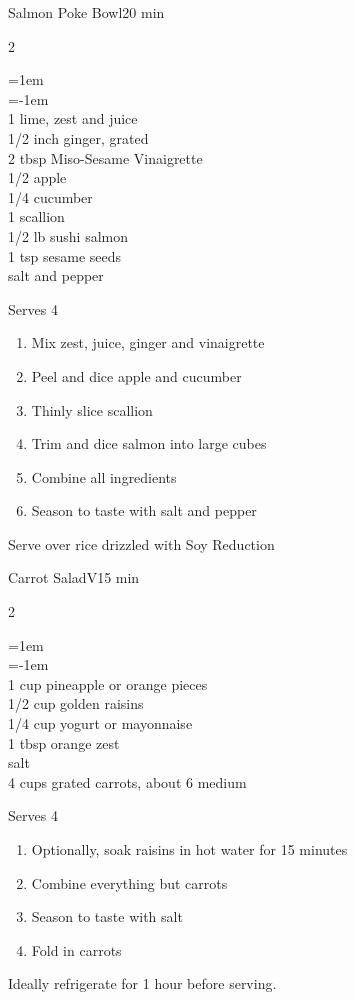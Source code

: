 \documentclass{article}
\newenvironment{recipe}[3][]
    {\begin{cardbase}[#1]{#2}{#3}
    \columnratio{0.333}
    \begin{paracol}{2}}
    {\end{paracol}\end{cardbase}}
\newcommand{\nextcolumn}{\switchcolumn}
\newenvironment{ingredients}
    {
    \begin{obeylines}
    \vspace{\parskip}
    \setlength{\parskip}{0.25em}
    \vspace{-0.25em}
    \leftskip=1em
    \parindent=-1em}
    {\end{obeylines}}
\newenvironment{steps}
    {\begin{enumerate}[leftmargin=*,topsep=0pt]}
    {\end{enumerate}}
\newcommand{\tag}[1]{\hspace{1em}#1}
\newcommand{\symboltag}[2]{\tag{#1\hspace{0.4em}#2}}
\newcommand{\totaltime}[1]{\symboltag{\raisebox{-0.1em}{\small\StopWatchEnd}}{#1}}
\begin{document}
\begin{recipe}{Salmon Poke Bowl}{\totaltime{20 min}}
\begin{ingredients}
1 lime, zest and juice
1/2 inch ginger, grated
2 tbsp Miso-Sesame Vinaigrette
1/2 apple
1/4 cucumber
1 scallion
1/2 lb sushi salmon
1 tsp sesame seeds
salt and pepper
\end{ingredients}
\nextcolumn
Serves 4
\begin{steps}
    \item Mix zest, juice, ginger and vinaigrette
    \item Peel and dice apple and cucumber
    \item Thinly slice scallion
    \item Trim and dice salmon into large cubes
    \item Combine all ingredients
    \item Season to taste with salt and pepper
\end{steps}
Serve over rice drizzled with Soy Reduction
\end{recipe}

\begin{recipe}{Carrot Salad}{\tag{V}\totaltime{15 min}}
\begin{ingredients}
1 cup pineapple or orange pieces
1/2 cup golden raisins
1/4 cup yogurt or mayonnaise
1 tbsp orange zest
salt
4 cups grated carrots, about 6 medium
\end{ingredients}
\nextcolumn
Serves 4
\begin{steps}
    \item Optionally, soak raisins in hot water for 15 minutes
    \item Combine everything but carrots
    \item Season to taste with salt
    \item Fold in carrots
\end{steps}
Ideally refrigerate for 1 hour before serving.
\end{recipe}
\end{document}

